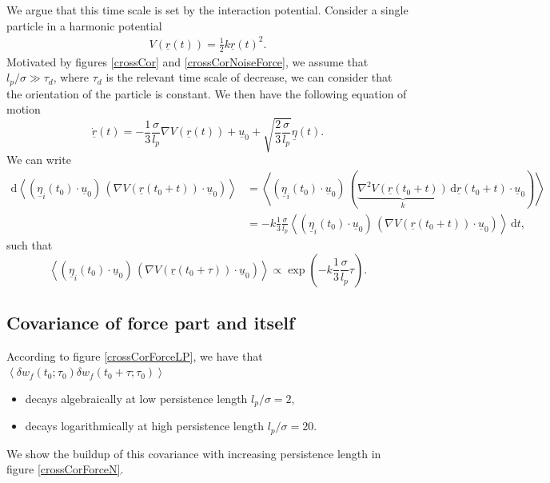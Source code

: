 \documentclass[10pt]{article}
\begin{document}
We argue that this time scale is set by the interaction potential. Consider a single particle in a harmonic potential
\begin{align*}
V(\underline{r}(t)) = \frac{1}{2} k \underline{r}(t)^2.
\end{align*}
Motivated by figures \ref{crossCor} and \ref{crossCorNoiseForce}, we assume that $l_p/\sigma \gg \tau_d$, where $\tau_d$ is the relevant time scale of decrease, \ie we can consider that the orientation of the particle is constant. We then have the following equation of motion
\begin{equation}
\dot{\underline{r}}(t) = - \frac{1}{3} \frac{\sigma}{l_p} \nabla V(\underline{r}(t)) + \underline{u}_0 + \sqrt{\frac{2}{3} \frac{\sigma}{l_p}} \underline{\eta}(t).
\end{equation}
We can write
\begin{align*}
\text{d}\left<\left(\underline{\eta}_i(t_0) \cdot \underline{u}_0\right) \, \left(\nabla V(\underline{r}(t_0 + t)) \cdot \underline{u}_0\right)\right> &= \left<\left(\underline{\eta}_i(t_0) \cdot \underline{u}_0\right) \, \left(\underbrace{\nabla^2 V(\underline{r}(t_0 + t))}_{k} \,\text{d}\underline{r}(t_0 + t) \cdot \underline{u}_0\right)\right>\\
&= - k \frac{1}{3} \frac{\sigma}{l_p} \left<\left(\underline{\eta}_i(t_0) \cdot \underline{u}_0\right) \, \left(\nabla V(\underline{r}(t_0 + t)) \cdot \underline{u}_0\right)\right> \, \text{d}t,
\end{align*}
such that
\begin{equation}
\left<\left(\underline{\eta}_i(t_0) \cdot \underline{u}_0\right) \, \left(\nabla V(\underline{r}(t_0 + \tau)) \cdot \underline{u}_0\right)\right> \propto \exp\left(- k \frac{1}{3} \frac{\sigma}{l_p} \tau\right).
\end{equation}

\subsection{Covariance of force part and itself}

According to figure \ref{crossCorForceLP}, we have that $\left<\delta w_f(t_0; \tau_0) \delta w_f(t_0 + \tau; \tau_0)\right>$
\begin{itemize}
  \item decays algebraically at low persistence length $l_p/\sigma = 2$,
  \item decays logarithmically at high persistence length $l_p/\sigma = 20$.
\end{itemize}
We show the buildup of this covariance with increasing persistence length in figure \ref{crossCorForceN}.
\end{document}
